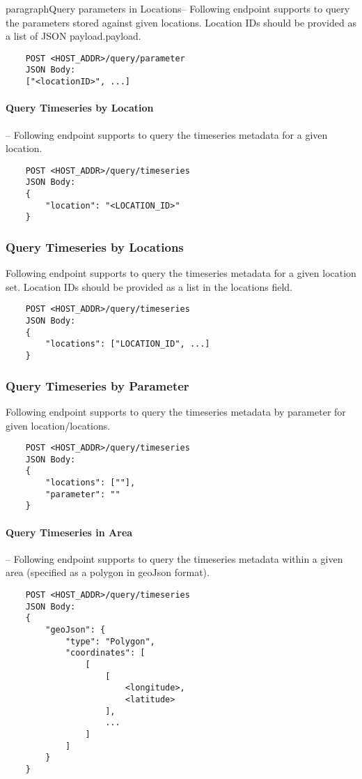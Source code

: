 paragraph{Query parameters in Locations}-- Following endpoint supports to query the parameters stored against given locations. Location IDs should be provided as a list of JSON payload.payload.
\begin{lstlisting}
    POST <HOST_ADDR>/query/parameter
    JSON Body:
    ["<locationID>", ...]
\end{lstlisting}

\paragraph{Query Timeseries by Location}-- Following endpoint supports to query the timeseries metadata for a given location.
\begin{lstlisting}
    POST <HOST_ADDR>/query/timeseries
    JSON Body:
    {
        "location": "<LOCATION_ID>"
    }
\end{lstlisting}

\subsubsection{Query Timeseries by Locations}
Following endpoint supports to query the timeseries metadata for a given location set. Location IDs should be provided as a list in the locations field.
\begin{lstlisting}
    POST <HOST_ADDR>/query/timeseries
    JSON Body:
    {
        "locations": ["LOCATION_ID", ...]
    }
\end{lstlisting}

\subsubsection{Query Timeseries by Parameter}
Following endpoint supports to query the timeseries metadata by parameter for given location/locations.
\begin{lstlisting}
    POST <HOST_ADDR>/query/timeseries
    JSON Body:
    {
        "locations": [""],
        "parameter": ""
    }
\end{lstlisting}

\paragraph{Query Timeseries in Area} -- Following endpoint supports to query the timeseries metadata within a given area (specified as a polygon in geoJson format).
\begin{lstlisting}
    POST <HOST_ADDR>/query/timeseries
    JSON Body:
    {
        "geoJson": {
            "type": "Polygon",
            "coordinates": [
                [
                    [
                        <longitude>,
                        <latitude>
                    ],
                    ...
                ]
            ]
        }
    }
\end{lstlisting}

